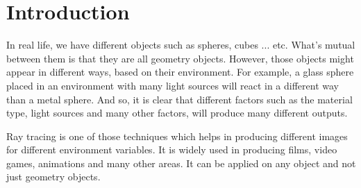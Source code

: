 \documentclass{article}
\begin{document}
	\section{Introduction}
	In real life, we have different objects such as spheres, cubes ... etc. What's mutual between them is that they are all geometry objects. However, those objects might appear in different ways, based on their environment. For example, a glass sphere placed in an environment with many light sources will react in a different way than a metal sphere. And so, it is clear that different factors such as the material type, light sources and many other factors, will produce many different outputs. \\
	\par Ray tracing is one of those techniques which helps in producing different images for different environment variables. It is widely used in producing films, video games, animations and many other areas. It can be applied on any object and not just geometry objects.
\end{document}
